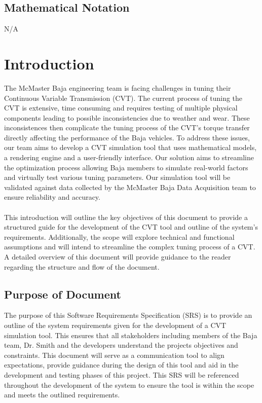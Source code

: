 \documentclass[12pt]{article}
\begin{document}
\subsection{Mathematical Notation}

N/A

\newpage


\section{Introduction}

The McMaster Baja engineering team is facing challenges in tuning their Continuous Variable Transmission (CVT). 
The current process of tuning the CVT is extensive, time consuming and requires testing of multiple physical components leading to possible inconsistencies due to weather and wear. 
These inconsistences then complicate the tuning process of the CVT’s torque transfer directly affecting the performance of the Baja vehicles. 
To address these issues, our team aims to develop a CVT simulation tool that uses mathematical models, a rendering engine and a user-friendly interface. 
Our solution aims to streamline the optimization process allowing Baja members to simulate real-world factors and virtually test various tuning parameters. 
Our simulation tool will be validated against data collected by the McMaster Baja Data Acquisition team to ensure reliability and accuracy.  
\\
\\
This introduction will outline the key objectives of this document to provide a structured guide for the development of the CVT tool and outline of the system’s requirements. 
Additionally, the scope will explore technical and functional assumptions and will intend to streamline the complex tuning process of a CVT. 
A detailed overview of this document will provide guidance to the reader regarding the structure and flow of the document. 

\subsection{Purpose of Document}

The purpose of this Software Requirements Specification (SRS) is to provide an outline of the system requirements given for the development of a CVT simulation tool. 
This ensures that all stakeholders including members of the Baja team, Dr. Smith and the developers understand the projects objectives and constraints. 
This document will serve as a communication tool to align expectations, provide guidance during the design of this tool and aid in the development and testing phases of this project. 
This SRS will be referenced throughout the development of the system to ensure the tool is within the scope and meets the outlined requirements. 
\end{document}
